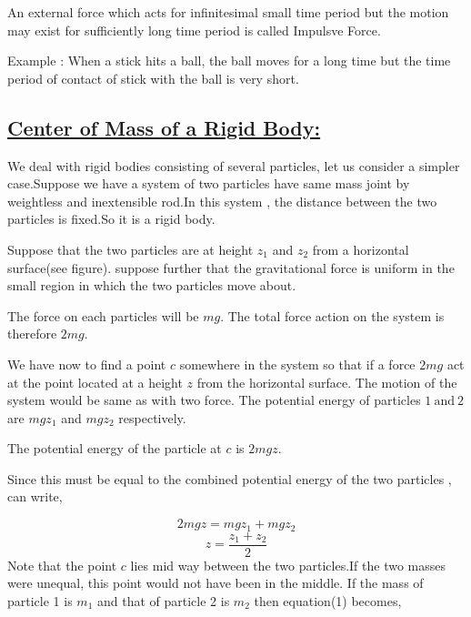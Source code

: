 \documentclass[12pt,a4paper]{article}
\begin{document}
    An external force which acts for infinitesimal small time period but the motion may exist for sufficiently long time period is called Impulsve Force.

    Example : When a stick hits a ball, the ball moves for a long time but the time period of contact of stick with the ball is very short.

    \subsection*{\underline{Center of Mass of a Rigid Body:}}

    We deal with rigid bodies consisting of several particles, let us consider a simpler case.Suppose we have a system of two particles have same mass joint by weightless and inextensible rod.In this system , the distance between the two particles is fixed.So it is a rigid body.

    \vspace*{0.4cm}

    \begin{center}
        \def\svgwidth{10cm}
        
    \end{center}

    Suppose that the two particles are at height $z_1$ and $z_2$ from a horizontal surface(see figure). suppose further that the gravitational force is uniform in the small region in which the two particles move about.

    The force on each particles will be $mg$. The total force action on the system is therefore $2mg$.

    We have now to find a point $c$ somewhere in the system so that if a force $2mg$ act at the point located at a height $z$ from the horizontal surface. The motion of the system would be same as with two force. The potential energy of particles $1 \ \mbox{and}\ 2$ are $mgz_1$ and $mgz_2$ respectively.

    The potential energy of the particle at $c$ is $2mgz$.

    Since this must be equal to the combined potential energy of the two particles , can write,

    \begin{equation*}
        2mgz = mgz_1 + mgz_2 \tag*{(1)}
    \end{equation*}
    \[z = \frac{z_1 + z_2}{2}\]
    Note that the point $c$ lies mid way between the two particles.If the two masses were unequal, this point would not have been in the middle. If the mass of particle 1 is $m_1$ and that of particle 2 is $m_2$ then equation(1) becomes,
\end{document}
